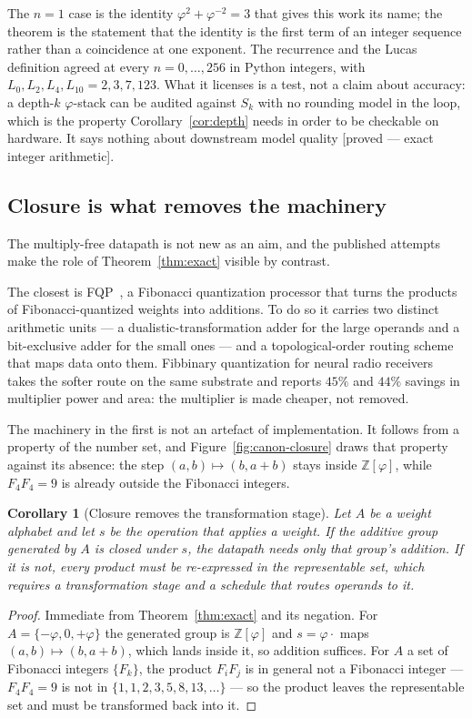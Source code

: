 \documentclass[11pt]{article}
\newtheorem{corollary}{Corollary}
\theoremstyle{definition}
\begin{document}
The $n=1$ case is the identity $\varphi^{2}+\varphi^{-2}=3$ that gives this work
its name; the theorem is the statement that the identity is the first term of an
integer sequence rather than a coincidence at one exponent. The recurrence and the
Lucas definition agreed at every $n=0,\dots,256$ in Python integers, with
$L_0,L_2,L_4,L_{10}=2,3,7,123$. What it licenses is a test, not a claim about
accuracy: a depth-$k$ $\varphi$-stack can be audited against
$S_k$ with no rounding model in the loop, which is the property
Corollary~\ref{cor:depth} needs in order to be checkable on hardware. It says
nothing about downstream model quality [proved --- exact integer arithmetic].

\subsection{Closure is what removes the machinery}\label{sec:closure}

The multiply-free datapath is not new as an aim, and the published attempts make
the role of Theorem~\ref{thm:exact} visible by contrast.

The closest is FQP~\cite{fqp}, a Fibonacci quantization processor that turns the
products of Fibonacci-quantized weights into additions. To do so it carries two
distinct arithmetic units --- a dualistic-transformation adder for the large
operands and a bit-exclusive adder for the small ones --- and a topological-order
routing scheme that maps data onto them. Fibbinary quantization for neural radio
receivers~\cite{fibbinary} takes the softer route on the same substrate and
reports $45\%$ and $44\%$ savings in multiplier power and area: the multiplier is
made cheaper, not removed.

The machinery in the first is not an artefact of implementation. It follows from
a property of the number set, and Figure~\ref{fig:canon-closure} draws that
property against its absence: the step $(a,b)\mapsto(b,a+b)$ stays inside
$\mathbb{Z}[\varphi]$, while $F_4F_4=9$ is already outside the Fibonacci
integers.

\begin{corollary}[Closure removes the transformation stage]\label{cor:closure}
Let $A$ be a weight alphabet and let $s$ be the operation that applies a weight.
If the additive group generated by $A$ is closed under $s$, the datapath needs
only that group's addition. If it is not, every product must be re-expressed in
the representable set, which requires a transformation stage and a schedule that
routes operands to it.
\end{corollary}
\begin{proof}
Immediate from Theorem~\ref{thm:exact} and its negation. For
$A=\{-\varphi,0,+\varphi\}$ the generated group is $\mathbb{Z}[\varphi]$ and
$s=\varphi\cdot$ maps $(a,b)\mapsto(b,a+b)$, which lands inside it, so addition
suffices. For $A$ a set of Fibonacci integers $\{F_k\}$, the product $F_iF_j$ is
in general not a Fibonacci integer --- $F_4F_4=9$ is not in
$\{1,1,2,3,5,8,13,\dots\}$ --- so the product leaves the representable set and
must be transformed back into it.
\end{proof}
\end{document}
